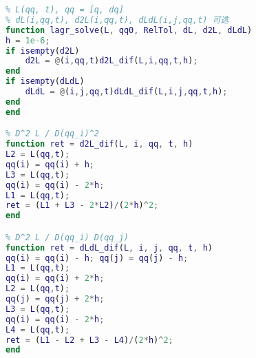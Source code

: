 \begin{lstlisting}[language=matlab, caption=lagr\_solve.m]
% 数值解拉格朗日方程
% L(qq, t), qq = [q, dq]
% dL(i,qq,t), d2L(i,qq,t), dLdL(i,j,qq,t) 可选
function lagr_solve(L, qq0, RelTol, dL, d2L, dLdL)
h = 1e-6;
if isempty(d2L)
    d2L = @(i,qq,t)d2L_dif(L,i,qq,t,h);
end
if isempty(dLdL)
    dLdL = @(i,j,qq,t)dLdL_dif(L,i,j,qq,t,h);
end
end

% D^2 L / D(qq_i)^2
function ret = d2L_dif(L, i, qq, t, h)
L2 = L(qq,t);
qq(i) = qq(i) + h;
L3 = L(qq,t);
qq(i) = qq(i) - 2*h;
L1 = L(qq,t);
ret = (L1 + L3 - 2*L2)/(2*h)^2;
end

% D^2 L / D(qq_i) D(qq_j)
function ret = dLdL_dif(L, i, j, qq, t, h)
qq(i) = qq(i) - h; qq(j) = qq(j) - h;
L1 = L(qq,t);
qq(i) = qq(i) + 2*h;
L2 = L(qq,t);
qq(j) = qq(j) + 2*h;
L3 = L(qq,t);
qq(i) = qq(i) - 2*h;
L4 = L(qq,t);
ret = (L1 - L2 + L3 - L4)/(2*h)^2;
end
\end{lstlisting}
